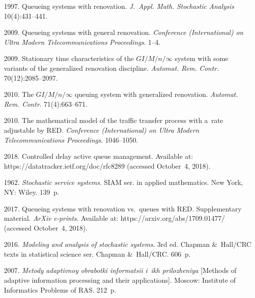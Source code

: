\begin{multicols}{2}
{{\begin{thebibliography}{99}
 1997.
Queueing systems with renovation. 
\textit{J.~Appl. Math. Stochastic Analysis} 10(4):431--441.


 2009. Queueing systems with general renovation.
\textit{Conference (International)
on Ultra Modern Telecommunications Proceedings}. 1--4.

 2009.
Stationary time characteristics of the ${GI/M/n/\infty}$
system with some variants of the generalized renovation discipline. \textit{Automat.
Rem. Contr.} 70(12):2085--2097.

2010. The ${GI/M/n/\infty}$ queuing system with generalized renovation.
\textit{Automat. Rem. Contr.} 71(4):663--671.

 2010.
The mathematical model of the traffic transfer process with a~rate adjustable by {RED}.
\textit{Conference (International) on Ultra Modern Telecommunications Proceedings}. 
1046--1050.

 2018.
Controlled delay active queue management.
Available at: {\sf https://datatracker.ietf.org/doc/rfc8289} (accessed October~4, 2018).

 1962. \textit{Stochastic service systems}. 
SIAM ser. in applied mathematics. New York, NY: Wiley. 139~p.

 2017.
Queueing systems with renovation vs.\ queues with RED. Supplementary material. 
\textit{ArXiv e-prints}. Available at: {\sf https://arxiv.\linebreak org/abs/1709.01477/}
(accessed October~4, 2018).

 2016. \textit{Modeling and analysis of stochastic systems}. 
3rd ed. Chapman \&~Hall/CRC texts in statistical science ser.
Chapman \&~Hall/CRC. 606~p.

 2007.
\textit{Metody adaptivnoy obrabotki informatsii i~ikh prilozheniya}
[Methods of adaptive information processing and their applications]. 
Moscow: Institute of Informatics Problems of RAS. 212~p.
\end{thebibliography} } }

\end{multicols}

